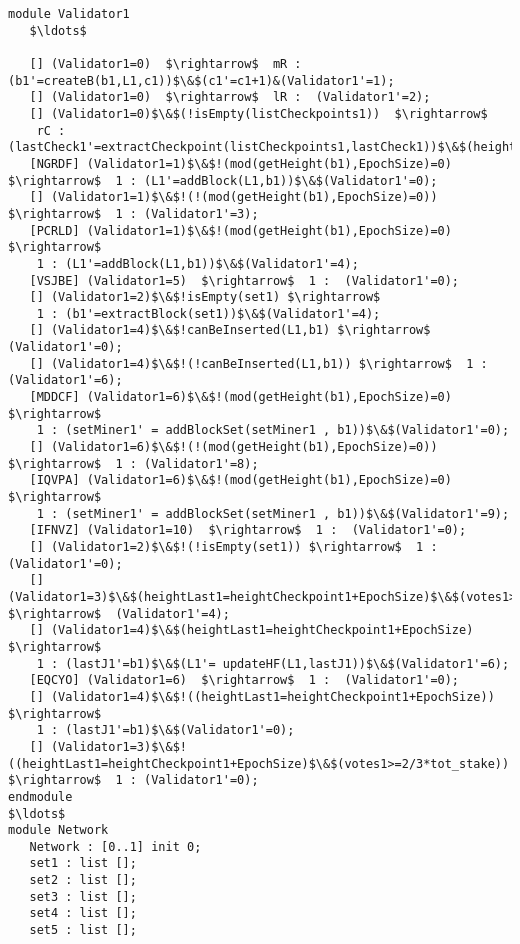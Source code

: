 \begin{lstlisting}[style=prism-color,caption={Generated PRISM program for the Hybrid Casper	Protocol.},captionpos=b,label={ex5-gen}]
module Validator1
   $\ldots$
	
   [] (Validator1=0)  $\rightarrow$  mR : (b1'=createB(b1,L1,c1))$\&$(c1'=c1+1)&(Validator1'=1); 
   [] (Validator1=0)  $\rightarrow$  lR :  (Validator1'=2); 
   [] (Validator1=0)$\&$(!isEmpty(listCheckpoints1))  $\rightarrow$  
   	rC : (lastCheck1'=extractCheckpoint(listCheckpoints1,lastCheck1))$\&$(heightLast1'=getHeight(extractCheckpoint(listCheckpoints1,lastCheck1)))$\&$(votes1'=calcVotes(Votes,extractCheckpoint(listCheckpoints1,lastCheck1)))$\&$(Validator1'=3); 
   [NGRDF] (Validator1=1)$\&$!(mod(getHeight(b1),EpochSize)=0)  $\rightarrow$  1 : (L1'=addBlock(L1,b1))$\&$(Validator1'=0); 
   [] (Validator1=1)$\&$!(!(mod(getHeight(b1),EpochSize)=0)) $\rightarrow$  1 : (Validator1'=3); 
   [PCRLD] (Validator1=1)$\&$!(mod(getHeight(b1),EpochSize)=0)  $\rightarrow$  
   	1 : (L1'=addBlock(L1,b1))$\&$(Validator1'=4); 
   [VSJBE] (Validator1=5)  $\rightarrow$  1 :  (Validator1'=0); 
   [] (Validator1=2)$\&$!isEmpty(set1) $\rightarrow$  
   	1 : (b1'=extractBlock(set1))$\&$(Validator1'=4); 
   [] (Validator1=4)$\&$!canBeInserted(L1,b1) $\rightarrow$  (Validator1'=0);
   [] (Validator1=4)$\&$!(!canBeInserted(L1,b1)) $\rightarrow$  1 : (Validator1'=6); 
   [MDDCF] (Validator1=6)$\&$!(mod(getHeight(b1),EpochSize)=0)  $\rightarrow$ 
   	1 : (setMiner1' = addBlockSet(setMiner1 , b1))$\&$(Validator1'=0); 
   [] (Validator1=6)$\&$!(!(mod(getHeight(b1),EpochSize)=0)) $\rightarrow$  1 : (Validator1'=8); 
   [IQVPA] (Validator1=6)$\&$!(mod(getHeight(b1),EpochSize)=0)  $\rightarrow$  
   	1 : (setMiner1' = addBlockSet(setMiner1 , b1))$\&$(Validator1'=9); 
   [IFNVZ] (Validator1=10)  $\rightarrow$  1 :  (Validator1'=0); 
   [] (Validator1=2)$\&$!(!isEmpty(set1)) $\rightarrow$  1 : (Validator1'=0);
   [] (Validator1=3)$\&$(heightLast1=heightCheckpoint1+EpochSize)$\&$(votes1>=2/3*tot_stake) $\rightarrow$  (Validator1'=4);
   [] (Validator1=4)$\&$(heightLast1=heightCheckpoint1+EpochSize) $\rightarrow$  
   	1 : (lastJ1'=b1)$\&$(L1'= updateHF(L1,lastJ1))$\&$(Validator1'=6); 
   [EQCYO] (Validator1=6)  $\rightarrow$  1 :  (Validator1'=0); 
   [] (Validator1=4)$\&$!((heightLast1=heightCheckpoint1+EpochSize)) $\rightarrow$  
   	1 : (lastJ1'=b1)$\&$(Validator1'=0); 
   [] (Validator1=3)$\&$!((heightLast1=heightCheckpoint1+EpochSize)$\&$(votes1>=2/3*tot_stake)) $\rightarrow$  1 : (Validator1'=0);
endmodule
$\ldots$
module Network
   Network : [0..1] init 0;
   set1 : list []; 
   set2 : list []; 
   set3 : list []; 
   set4 : list []; 
   set5 : list []; 


\end{lstlisting}
